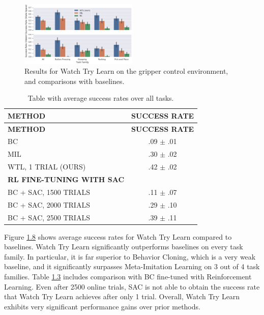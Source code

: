 \documentclass[
  letterpaper,
  DIV=11,
  numbers=noendperiod,
  oneside]{scrreprt}
\theoremstyle{remark}
\begin{document}
\begin{figure}

{\centering \includegraphics[width=0.5\textwidth,height=\textheight]{Figures/watch-try-learn-results.png}

}

\caption{Results for Watch Try Learn on the gripper control environment,
and comparisons with baselines.}

\end{figure}%

\label{tab:watch-try-learn-table}
\begin{longtable}[]{@{}lc@{}}
\caption{Table with average success rates over all
tasks.}\tabularnewline
\toprule\noalign{}
\textbf{METHOD} & \textbf{SUCCESS RATE} \\
\midrule\noalign{}
\endfirsthead
\toprule\noalign{}
\textbf{METHOD} & \textbf{SUCCESS RATE} \\
\midrule\noalign{}
\endhead
\bottomrule\noalign{}
\endlastfoot
BC & .09 \(\pm\) .01 \\
MIL & .30 \(\pm\) .02 \\
WTL, 1 TRIAL (OURS) & .42 \(\pm\) .02 \\
\textbf{RL FINE-TUNING WITH SAC} & \\
BC + SAC, 1500 TRIALS & .11 \(\pm\) .07 \\
BC + SAC, 2000 TRIALS & .29 \(\pm\) .10 \\
BC + SAC, 2500 TRIALS & .39 \(\pm\) .11 \\
\end{longtable}

Figure \hyperref[fig:watch-try-learn-results]{1.8} shows average success
rates for Watch Try Learn compared to baselines. Watch Try Learn
significantly outperforms baselines on every task family. In particular,
it is far superior to Behavior Cloning, which is a very weak baseline,
and it significantly surpasses Meta-Imitation Learning on 3 out of 4
task families. Table \hyperref[tab:watch-try-learn-table]{1.3} includes
comparison with BC fine-tuned with Reinforcement Learning. Even after
2500 online trials, SAC is not able to obtain the success rate that
Watch Try Learn achieves after only 1 trial. Overall, Watch Try Learn
exhibits very significant performance gains over prior methods.
\end{document}

